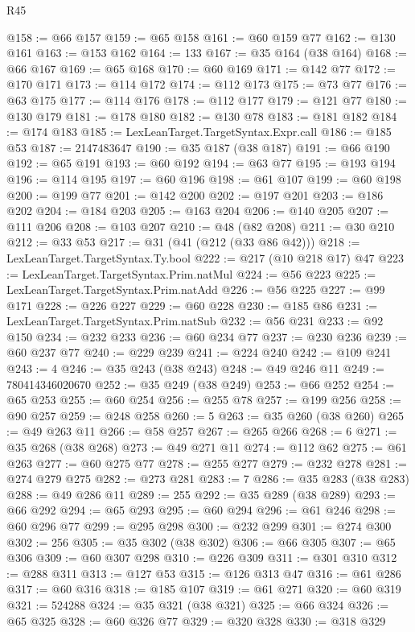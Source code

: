 \begin{lexlean}{R45}
\begin{coremodule}
@158 := @66 @157
@159 := @65 @158
@161 := @60 @159 @77
@162 := @130 @161
@163 := @153 @162
@164 := 133
@167 := @35 @164 (@38 @164)
@168 := @66 @167
@169 := @65 @168
@170 := @60 @169
@171 := @142 @77
@172 := @170 @171
@173 := @114 @172
@174 := @112 @173
@175 := @73 @77
@176 := @63 @175
@177 := @114 @176
@178 := @112 @177
@179 := @121 @77
@180 := @130 @179
@181 := @178 @180
@182 := @130 @78
@183 := @181 @182
@184 := @174 @183
@185 := LexLeanTarget.TargetSyntax.Expr.call
@186 := @185 @53
@187 := 2147483647
@190 := @35 @187 (@38 @187)
@191 := @66 @190
@192 := @65 @191
@193 := @60 @192
@194 := @63 @77
@195 := @193 @194
@196 := @114 @195
@197 := @60 @196
@198 := @61 @107
@199 := @60 @198
@200 := @199 @77
@201 := @142 @200
@202 := @197 @201
@203 := @186 @202
@204 := @184 @203
@205 := @163 @204
@206 := @140 @205
@207 := @111 @206
@208 := @103 @207
@210 := @48 (@82 @208)
@211 := @30 @210
@212 := @33 @53
@217 := @31 (@41 (@212 (@33 @86 @42)))
@218 := LexLeanTarget.TargetSyntax.Ty.bool
@222 := @217 (@10 @218 @17) @47
@223 := LexLeanTarget.TargetSyntax.Prim.natMul
@224 := @56 @223
@225 := LexLeanTarget.TargetSyntax.Prim.natAdd
@226 := @56 @225
@227 := @99 @171
@228 := @226 @227
@229 := @60 @228
@230 := @185 @86
@231 := LexLeanTarget.TargetSyntax.Prim.natSub
@232 := @56 @231
@233 := @92 @150
@234 := @232 @233
@236 := @60 @234 @77
@237 := @230 @236
@239 := @60 @237 @77
@240 := @229 @239
@241 := @224 @240
@242 := @109 @241
@243 := 4
@246 := @35 @243 (@38 @243)
@248 := @49 @246 @11
@249 := 780414346020670
@252 := @35 @249 (@38 @249)
@253 := @66 @252
@254 := @65 @253
@255 := @60 @254
@256 := @255 @78
@257 := @199 @256
@258 := @90 @257
@259 := @248 @258
@260 := 5
@263 := @35 @260 (@38 @260)
@265 := @49 @263 @11
@266 := @58 @257
@267 := @265 @266
@268 := 6
@271 := @35 @268 (@38 @268)
@273 := @49 @271 @11
@274 := @112 @62
@275 := @61 @263
@277 := @60 @275 @77
@278 := @255 @277
@279 := @232 @278
@281 := @274 @279 @275
@282 := @273 @281
@283 := 7
@286 := @35 @283 (@38 @283)
@288 := @49 @286 @11
@289 := 255
@292 := @35 @289 (@38 @289)
@293 := @66 @292
@294 := @65 @293
@295 := @60 @294
@296 := @61 @246
@298 := @60 @296 @77
@299 := @295 @298
@300 := @232 @299
@301 := @274 @300
@302 := 256
@305 := @35 @302 (@38 @302)
@306 := @66 @305
@307 := @65 @306
@309 := @60 @307 @298
@310 := @226 @309
@311 := @301 @310
@312 := @288 @311
@313 := @127 @53
@315 := @126 @313 @47
@316 := @61 @286
@317 := @60 @316
@318 := @185 @107
@319 := @61 @271
@320 := @60 @319
@321 := 524288
@324 := @35 @321 (@38 @321)
@325 := @66 @324
@326 := @65 @325
@328 := @60 @326 @77
@329 := @320 @328
@330 := @318 @329

\end{coremodule}
\end{lexlean}
